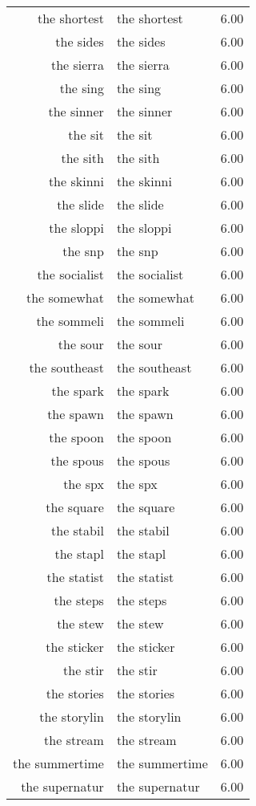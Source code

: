 \begin{table}[ht]
\begin{tabular}{rlr}
  the shortest & the shortest & 6.00 \\ 
  the sides & the sides & 6.00 \\ 
  the sierra & the sierra & 6.00 \\ 
  the sing & the sing & 6.00 \\ 
  the sinner & the sinner & 6.00 \\ 
  the sit & the sit & 6.00 \\ 
  the sith & the sith & 6.00 \\ 
  the skinni & the skinni & 6.00 \\ 
  the slide & the slide & 6.00 \\ 
  the sloppi & the sloppi & 6.00 \\ 
  the snp & the snp & 6.00 \\ 
  the socialist & the socialist & 6.00 \\ 
  the somewhat & the somewhat & 6.00 \\ 
  the sommeli & the sommeli & 6.00 \\ 
  the sour & the sour & 6.00 \\ 
  the southeast & the southeast & 6.00 \\ 
  the spark & the spark & 6.00 \\ 
  the spawn & the spawn & 6.00 \\ 
  the spoon & the spoon & 6.00 \\ 
  the spous & the spous & 6.00 \\ 
  the spx & the spx & 6.00 \\ 
  the square & the square & 6.00 \\ 
  the stabil & the stabil & 6.00 \\ 
  the stapl & the stapl & 6.00 \\ 
  the statist & the statist & 6.00 \\ 
  the steps & the steps & 6.00 \\ 
  the stew & the stew & 6.00 \\ 
  the sticker & the sticker & 6.00 \\ 
  the stir & the stir & 6.00 \\ 
  the stories & the stories & 6.00 \\ 
  the storylin & the storylin & 6.00 \\ 
  the stream & the stream & 6.00 \\ 
  the summertime & the summertime & 6.00 \\ 
  the supernatur & the supernatur & 6.00 \\ 

\end{tabular}
\end{table}
